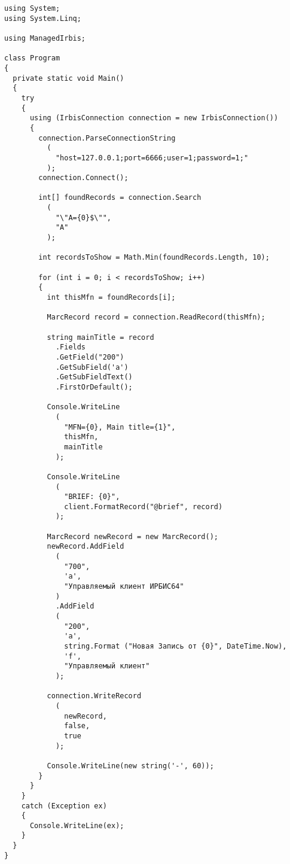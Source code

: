 \begin{lstlisting}
using System;
using System.Linq;

using ManagedIrbis;

class Program
{
  private static void Main()
  {
    try
    {
      using (IrbisConnection connection = new IrbisConnection())
      {
        connection.ParseConnectionString
          (
            "host=127.0.0.1;port=6666;user=1;password=1;"
          );
        connection.Connect();

        int[] foundRecords = connection.Search
          (
            "\"A={0}$\"",
            "А"
          );

        int recordsToShow = Math.Min(foundRecords.Length, 10);

        for (int i = 0; i < recordsToShow; i++)
        {
          int thisMfn = foundRecords[i];

          MarcRecord record = connection.ReadRecord(thisMfn);

          string mainTitle = record
            .Fields
            .GetField("200")
            .GetSubField('a')
            .GetSubFieldText()
            .FirstOrDefault();

          Console.WriteLine
            (
              "MFN={0}, Main title={1}",
              thisMfn,
              mainTitle
            );

          Console.WriteLine
            (
              "BRIEF: {0}",
              client.FormatRecord("@brief", record)
            );

          MarcRecord newRecord = new MarcRecord();
          newRecord.AddField
            (
              "700",
              'a',
              "Управляемый клиент ИРБИС64"
            )
            .AddField
            (
              "200",
              'a', 
              string.Format ("Новая Запись от {0}", DateTime.Now),
              'f',
              "Управляемый клиент"
            );

          connection.WriteRecord
            (
              newRecord, 
              false, 
              true
            );

          Console.WriteLine(new string('-', 60));
        }
      }
    }
    catch (Exception ex)
    {
      Console.WriteLine(ex);
    }
  }
}\end{lstlisting}
